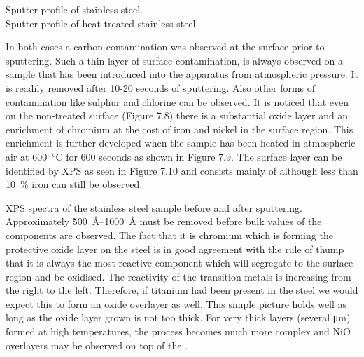  \newpage

  Sputter profile of stainless steel.\\

 \vspace{11cm}
  Sputter profile of heat treated
 stainless steel.
 \newpage

In both cases a carbon contamination was observed at the surface prior to sputtering. Such a thin layer of surface contamination, is always observed on a sample that has been introduced into the apparatus from atmospheric pressure. It is readily removed after 10-20 seconds of sputtering. Also other forms of contamination like sulphur and chlorine can be observed. It is noticed that even on the non-treated surface (Figure 7.8) there is a substantial oxide layer and an enrichment of chromium at the cost of iron and nickel in the surface region. This enrichment is further developed when the sample has been heated in atmospheric air at \SI{600}{\degreeCelsius} for 600 seconds as shown in Figure 7.9. The surface layer can be identified by XPS as seen in Figure 7.10 and consists mainly of  although less than \SI{10}{\percent} iron can still be observed.

 \vspace{11cm}

  XPS spectra of the stainless
 steel sample before and after sputtering.\\

Approximately \SIrange{500}{1000}{\angstrom} must be removed before bulk values of the components are observed. The fact that it is chromium which is forming the protective oxide layer on the steel is in good agreement with the rule of thump that it is always the most reactive component which will segregate to the surface region and be oxidised. The reactivity of the transition metals is increasing from the right to the left. Therefore, if titanium had been present in the steel we would expect this to form an oxide overlayer as well. This simple picture holds well as long as the oxide layer grown is not too thick. For very thick layers (several \si{\micro m}) formed at high temperatures, the process becomes much more complex and NiO overlayers may be observed on top of the  \cite{alstrup}.

